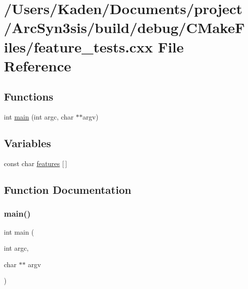 \hypertarget{a00825}{}\section{/\+Users/\+Kaden/\+Documents/project/\+Arc\+Syn3sis/build/debug/\+C\+Make\+Files/feature\+\_\+tests.cxx File Reference}
\label{a00825}
\subsection*{Functions}
\begin{DoxyCompactItemize}
\item 
int \hyperlink{a00825_a3c04138a5bfe5d72780bb7e82a18e627}{main} (int argc, char $\ast$$\ast$argv)
\end{DoxyCompactItemize}
\subsection*{Variables}
\begin{DoxyCompactItemize}
\item 
const char \hyperlink{a00825_a1582568e32f689337602a16bf8a5bff0}{features} \mbox{[}$\,$\mbox{]}
\end{DoxyCompactItemize}


\subsection{Function Documentation}
\mbox{\label{a00825_a3c04138a5bfe5d72780bb7e82a18e627}} 
\subsubsection{\texorpdfstring{main()}{main()}}
{\footnotesize\ttfamily int main (\begin{DoxyParamCaption}\item[{int}]{argc,  }\item[{char $\ast$$\ast$}]{argv }\end{DoxyParamCaption})}



